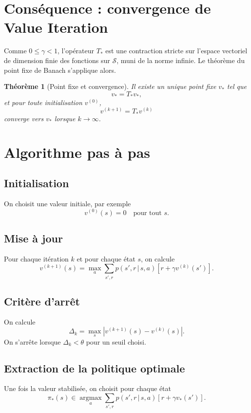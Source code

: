 \documentclass[11pt,a4paper]{article}
\newtheorem*{theoreme}{Théorème}
\newcommand{\argmax}{\operatorname*{argmax}}
\newcommand{\given}{\,|\,}
\begin{document}
\section{Conséquence : convergence de Value Iteration}

Comme $0\le \gamma <1$, l'opérateur $T_*$ est une contraction stricte sur l'espace vectoriel de dimension finie des fonctions sur $\mathcal S$, muni de la norme infinie. Le théorème du point fixe de Banach s'applique alors.

\begin{theoreme}[Point fixe et convergence]
Il existe un unique point fixe $v_*$ tel que
\[
v_* = T_* v_*,
\]
et pour toute initialisation $v^{(0)}$,
\[
v^{(k+1)} = T_*v^{(k)}
\]
converge vers $v_*$ lorsque $k\to\infty$.
\end{theoreme}

\section{Algorithme pas à pas}

\subsection{Initialisation}

On choisit une valeur initiale, par exemple
\[
v^{(0)}(s)=0 \quad \text{pour tout } s.
\]

\subsection{Mise à jour}

Pour chaque itération $k$ et pour chaque état $s$, on calcule
\[
v^{(k+1)}(s)=\max_{a}\sum_{s',r} p(s',r\given s,a)\left[r+\gamma v^{(k)}(s')\right].
\]

\subsection{Critère d'arrêt}

On calcule
\[
\Delta_k = \max_s |v^{(k+1)}(s)-v^{(k)}(s)|.
\]
On s'arrête lorsque $\Delta_k < \theta$ pour un seuil choisi.

\subsection{Extraction de la politique optimale}

Une fois la valeur stabilisée, on choisit pour chaque état
\[
\pi_*(s) \in \argmax_a \sum_{s',r} p(s',r\given s,a)\left[r+\gamma v_*(s')\right].
\]
\end{document}

